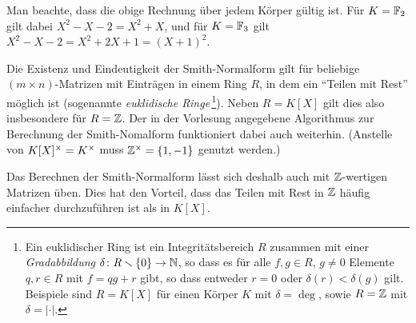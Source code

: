 Man beachte, dass die obige Rechnung über jedem Körper gültig ist.
Für $K = \mathbb{F}_2$ gilt dabei $X^2 - X - 2 = X^2 + X$, und für $K = \mathbb{F}_3$ gilt $X^2 - X - 2 = X^2 + 2X + 1 = (X+1)^2$.

\begin{remark}
  Die Existenz und Eindeutigkeit der Smith-Normalform gilt für beliebige $(m \times n)$-Matrizen mit Einträgen in einem Ring $R$, in dem ein \enquote{Teilen mit Rest} möglich ist (sogenannte \emph{euklidische Ringe}\,\footnote{
  Ein euklidischer Ring ist ein Integritätsbereich $R$ zusammen mit einer \emph{Gradabbildung} $\delta \colon R \smallsetminus \{0\} \to \mathbb{N}$, so dass es für alle $f, g \in R$, $g \neq 0$ Elemente $q , r \in R$ mit $f = qg + r$ gibt, so dass entweder $r = 0$ oder $\delta(r) < \delta(g)$ gilt.
  Beispiele sind $R = K[X]$ für einen Körper $K$ mit $\delta = \deg$, sowie $R = \mathbb{Z}$ mit $\delta = |\cdot|$.}).
  Neben $R = K[X]$ gilt dies also insbesondere für $R = \mathbb{Z}$.
  Der in der Vorlesung angegebene Algorithmus zur Berechnung der Smith-Nomalform funktioniert dabei auch weiterhin.
  (Anstelle von $K[X]^\times = K^\times$ muss $\mathbb{Z}^\times = \{1, -1\}$ genutzt werden.)
  
  Das Berechnen der Smith-Normalform lässt sich deshalb auch mit $\mathbb{Z}$-wertigen Matrizen üben.
  Dies hat den Vorteil, dass das Teilen mit Rest in $\mathbb{Z}$ häufig einfacher durchzuführen ist als in $K[X]$.
\end{remark}

